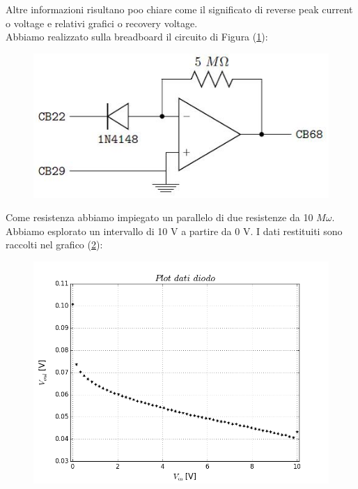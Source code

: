 \documentclass[journal, a4paper]{IEEEtran}
\begin{document}
Altre informazioni risultano poo chiare come il significato di reverse peak current o voltage e relativi grafici o recovery voltage.\\
Abbiamo realizzato sulla breadboard il circuito di Figura (\ref{op-diod}):\\

\begin{figure}[htp]
\caption{}
\label{op-diod}
\centering
\includegraphics[scale=.4]{diodo}
\end{figure}

Come resistenza abbiamo impiegato un parallelo di due resistenze da 10 $M\omega$. Abbiamo esplorato un intervallo di 10 V a partire da 0 V. I dati restituiti sono raccolti nel grafico (\ref{plotdiodosil}):\\

\begin{figure}[htp]
\caption{}
\label{plotdiodosil}
\centering
\includegraphics[scale=.35]{plotdiodosil}
\end{figure}
\end{document}
